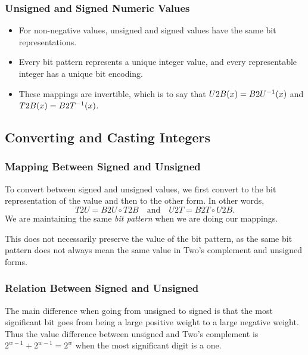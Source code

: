 \documentclass[class=article, crop=false]{standalone}
\begin{document}
  \subsubsection{Unsigned and Signed Numeric Values}
  \begin{itemize}
    \item For non-negative values, unsigned and signed values have the same bit representations.
    \item Every bit pattern represents a unique integer value, and every representable integer has a unique bit encoding.
    \item These mappings are invertible, which is to say that $U2B(x) = B2U^{-1}(x)$ and $T2B(x) = B2T^{-1}(x)$.
  \end{itemize}
  \subsection{Converting and Casting Integers}
  \subsubsection{Mapping Between Signed and Unsigned}
  To convert between signed and unsigned values, we first convert to the bit representation of the value and then to the other form. In other words,
  \[
    T2U = B2U\circ T2B \quad \text{and}\quad U2T = B2T\circ U2B.
  \]
  We are maintaining the same \emph{bit pattern} when we are doing our mappings.
  \begin{note}{}
    This does not necessarily preserve the value of the bit pattern, as the same bit pattern does not always mean the same value in Two's complement and unsigned forms.
  \end{note}
  \subsubsection{Relation Between Signed and Unsigned}
  The main difference when going from unsigned to signed is that the most significant bit goes from being a large positive weight to a large negative weight. Thus the value difference between unsigned and Two's complement is $2^{w-1} + 2^{w-1} = 2^w$ when the most significant digit is a one.
\end{document}
